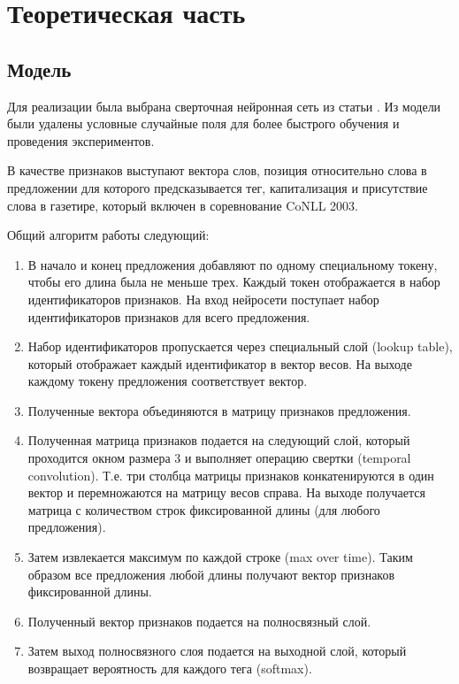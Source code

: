 \chapter{Теоретическая часть}
\section{Модель}

  Для реализации была выбрана сверточная нейронная сеть из статьи \citep{collobert2011natural}.
  Из модели были удалены условные случайные поля для более быстрого обучения и проведения экспериментов.

  В качестве признаков выступают вектора слов, позиция относительно слова в предложении
  для которого предсказывается тег, капитализация и присутствие слова в газетире,
  который включен в соревнование CoNLL 2003.

  Общий алгоритм работы следующий:
  \begin{enumerate}
    \item В начало и конец предложения добавляют по одному специальному токену, чтобы его длина была
    не меньше трех. Каждый токен отображается в набор идентификаторов признаков.
    На вход нейросети поступает набор идентификаторов признаков для всего предложения.

    \item Набор идентификаторов пропускается через специальный слой (lookup table), который отображает
    каждый идентификатор в вектор весов. На выходе каждому токену предложения соответствует
    вектор.
    \item Полученные вектора объединяются в матрицу признаков предложения.
    \item Полученная матрица признаков подается на следующий
    слой, который проходится окном размера 3 и выполняет операцию свертки (temporal convolution).
    Т.е. три столбца матрицы признаков конкатенируются в один вектор и перемножаются
    на матрицу весов справа.
    На выходе получается матрица с количеством строк фиксированной длины (для любого предложения).
    \item Затем извлекается максимум по каждой строке (max over time).
    Таким образом все предложения любой длины получают вектор признаков фиксированной длины.
    \item Полученный вектор признаков подается на полносвязный слой.
    \item Затем выход полносвязного слоя подается на выходной слой, который возвращает вероятность
    для каждого тега (softmax).
  \end{enumerate}


